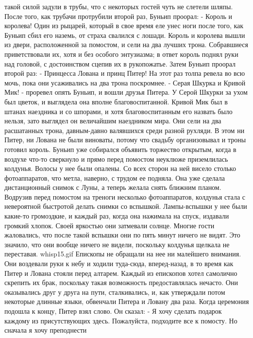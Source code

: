 такой силой задули в трубы, что с некоторых гостей чуть не слетели 
шляпы.
    После того, как трубачи протрубили второй раз, Буньип проорал:
    - Король и королева!
    Один из рыцарей, который в свое время еле унес ноги после того, 
как Буньип сбил его наземь, от страха свалился с лошади.
    Король и королева вышли из двери, расположенной за помостом, и 
сели на два лучших трона. Собравшиеся приветствовали их, хотя и без 
особого энтузиазма; в ответ король поднял руки над головой, с 
достоинством сцепив их в рукопожатье.
    Затем Буньип проорал второй раз:
    - Принцесса Лована и принц Питер!
    На этот раз толпа ревела во всю мочь, пока они усаживались на два 
трона поскромнее.
    - Серая Шкурка и Кривой Мик! - проревел опять Буньип, и вошли 
друзья Питера. У Серой Шкурки за ухом был цветок, и выглядела она 
вполне благовоспитанной. Кривой Мик был в штанах наездника и со 
шпорами, и хотя благовоспитанным его назвать было нельзя, зато 
выглядел он величайшим наездником мира. Они сели на два расшатанных 
трона, давным-давно валявшихся среди разной рухляди. В этом ни Питер, 
ни Лована не были виноваты, потому что свадьбу организовывал и троны 
готовил король.
    Буньип уже собирался объявить торжество открытым, когда в воздухе 
что-то сверкнуло и прямо перед помостом неуклюже приземлилась 
колдунья. Волосы у нее были опалены. Со всех сторон на ней висело 
столько фотоаппаратов, что метла, наверно, с трудом ее подняла. Она 
уже сделала дистанционный снимок с Луны, а теперь желала снять ближним 
планом.
    Водрузив перед помостом на треноги несколько фотоаппаратов, 
колдунья стала с невероятной быстротой делать снимки со вспышкой. 
Лампы-вспышки у нее были какие-то громоздкие, и каждый раз, когда она 
нажимала на спуск, издавали громкий хлопок. Своей яркостью они 
затмевали солнце. Многие гости жаловались, что после такой вспышки они 
по пять минут ничего не видят. Это значило, что они вообще ничего не 
видели, поскольку колдунья щелкала не переставая.
    {whisp15.gif}
    Епископы не обращали на нее ни малейшего внимания. Они воздевали 
руки к небу и ходили туда-сюда, вперед-назад, в то время как Питер и 
Лована стояли перед алтарем. Каждый из епископов хотел самолично 
скрепить их брак, поскольку такая возможность предоставлялась нечасто. 
Они оказывались друг у друга на пути, сталкивались, и, как утверждали 
потом некоторые длинные языки, обвенчали Питера и Ловану два раза.
    Когда церемония подошла к концу, Питер взял слово. Он сказал:
    - Я хочу сделать подарок каждому из присутствующих здесь. 
Пожалуйста, подходите все к помосту. Но сначала я хочу преподнести 
